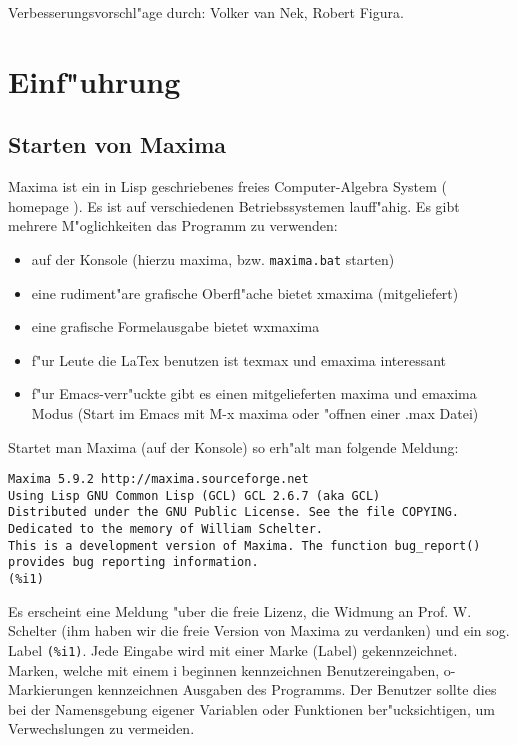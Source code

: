 \documentclass[spanish,12pt,a4paper]{article}
\begin{document}
Verbesserungsvorschl"age durch: Volker van Nek, Robert Figura.


\section{Einf"uhrung}



\subsection{Starten von Maxima}

Maxima ist ein in Lisp geschriebenes freies Computer-Algebra System ( homepage ). Es ist auf verschiedenen Betriebssystemen lauff"ahig. Es gibt mehrere M"oglichkeiten das Programm zu verwenden:

\begin{itemize}
\item auf der Konsole (hierzu maxima, bzw. \verb|maxima.bat| starten)

\item eine rudiment"are grafische Oberfl"ache bietet xmaxima (mitgeliefert)

\item eine grafische Formelausgabe bietet wxmaxima

\item f"ur Leute die LaTex benutzen ist texmax und emaxima interessant

\item f"ur Emacs-verr"uckte gibt es einen mitgelieferten maxima und emaxima Modus (Start im Emacs mit M-x maxima oder "offnen einer .max Datei)
\end{itemize}

Startet man Maxima (auf der Konsole) so erh"alt man folgende Meldung:

\scriptsize
\begin{verbatim}
Maxima 5.9.2 http://maxima.sourceforge.net
Using Lisp GNU Common Lisp (GCL) GCL 2.6.7 (aka GCL)
Distributed under the GNU Public License. See the file COPYING.
Dedicated to the memory of William Schelter.
This is a development version of Maxima. The function bug_report()
provides bug reporting information.
(%i1)
\end{verbatim}
\normalsize

Es erscheint eine Meldung "uber die freie Lizenz, die Widmung an Prof. W. Schelter (ihm haben wir die freie Version von Maxima zu verdanken) und ein sog. Label  \verb|(%i1)|. Jede Eingabe wird mit einer Marke (Label) gekennzeichnet. Marken, welche mit einem i beginnen kennzeichnen Benutzereingaben, o-Markierungen kennzeichnen Ausgaben des Programms. Der Benutzer sollte dies bei der Namensgebung eigener Variablen oder Funktionen ber"ucksichtigen, um Verwechslungen zu vermeiden.
\end{document}
